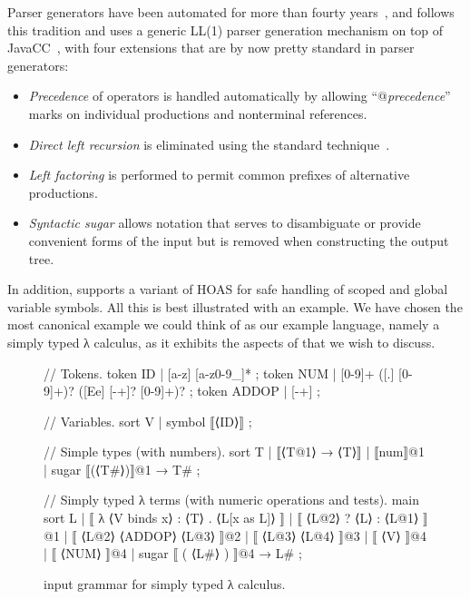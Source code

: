 \documentclass[letterpaper]{llncs}
\begin{document}
Parser generators have been automated for more than fourty years~\cite{GruneJacobs:2008}, and \HAX
follows this tradition and uses a generic LL(1) parser generation mechanism on top of
JavaCC~\cite{JavaCC}, with four extensions that are by now pretty standard in parser generators:
\begin{itemize}

\item \emph{Precedence} of operators is handled automatically by allowing ``@\textit{precedence}''
  marks on individual productions and nonterminal references.

\item \emph{Direct left recursion} is eliminated using the standard technique~\cite{Aho+:2006}.

\item \emph{Left factoring} is performed to permit common prefixes of alternative productions.

\item \emph{Syntactic sugar} allows notation that serves to disambiguate or provide convenient forms
  of the input but is removed when constructing the output tree.

\end{itemize}
In addition, \HAX supports a variant of HOAS for safe handling of scoped and global variable
symbols.
All this is best illustrated with an example. We have chosen the most canonical example we could
think of as our example language, namely a simply typed λ calculus, as it exhibits the aspects of
\HAX that we wish to discuss.

\begin{figure}[t]\small
  \begin{hacs}[texcl,xleftmargin=2em,numbers=left,firstnumber=3]
// Tokens.
token ID | [a-z] [a-z0-9_]*  ;
token NUM | [0-9]+ ([.] [0-9]+)? ([Ee] [-+]? [0-9]+)? ;
token ADDOP | [-+] ;

// Variables.
sort V  | symbol ⟦⟨ID⟩⟧ ;

// Simple types (with numbers).
sort T  | ⟦⟨T@1⟩ → ⟨T⟩⟧  | ⟦num⟧@1   | sugar ⟦(⟨T#⟩)⟧@1 →   T# ;

// Simply typed λ terms (with numeric operations and tests).
main sort L
| ⟦ λ ⟨V binds x⟩ : ⟨T⟩ . ⟨L[x as L]⟩ ⟧
| ⟦ ⟨L@2⟩ ? ⟨L⟩ : ⟨L@1⟩ ⟧@1
| ⟦ ⟨L@2⟩ ⟨ADDOP⟩ ⟨L@3⟩ ⟧@2
| ⟦ ⟨L@3⟩ ⟨L@4⟩ ⟧@3
| ⟦ ⟨V⟩ ⟧@4
| ⟦ ⟨NUM⟩ ⟧@4
| sugar ⟦ ( ⟨L#⟩ ) ⟧@4  →  L#
;
  \end{hacs}
  \caption{\HAX input grammar for simply typed λ calculus.}
  \label{fig:parser}
\end{figure}
\end{document}
